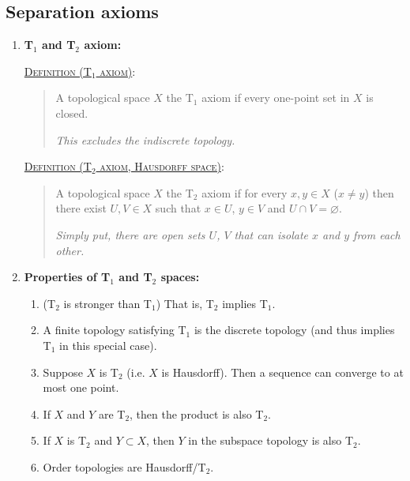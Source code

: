 \documentclass[letterpaper, 12pt]{article}
\newcommand{\Taxiom}[1]{T$_\text{#1}$}
\newcommand{\defn}[2]{\textsc{\underline{Definition (#1)}:}\begin{quote} #2\end{quote}}
\let\emptyset\varnothing
\begin{document}
    \subsection{Separation axioms}
        \begin{enumerate}[resume]
        \item \textbf{\Taxiom{1} and \Taxiom{2} axiom:}

        \defn{\Taxiom{1} axiom}{A topological space $X$ the \Taxiom{1} axiom if every one-point set in $X$ is closed.

        \textit{This excludes the indiscrete topology.}}

        \defn{\Taxiom{2} axiom, Hausdorff space}{A topological space $X$ the \Taxiom{2} axiom if for every $x, y\in X$ ($x\ne y$) then there exist $U, V\in X$ such that $x\in U$, $y\in V$ and $U\cap V = \emptyset$.

        \textit{Simply put, there are open sets $U$, $V$ that can isolate $x$ and $y$ from each other.}}
        \item \textbf{Properties of \Taxiom{1} and \Taxiom{2} spaces:}
        \begin{enumerate}
        \item (\Taxiom{2} is stronger than \Taxiom{1}) That is, \Taxiom{2} implies \Taxiom{1}.
        \item A finite topology satisfying \Taxiom{1} is the discrete topology (and thus implies \Taxiom{1} in this special case).
        \item Suppose $X$ is \Taxiom{2} (i.e. $X$ is Hausdorff). Then a sequence can converge to at most one point.
        \item If $X$ and $Y$ are \Taxiom{2}, then the product is also \Taxiom{2}.
        \item If $X$ is \Taxiom{2} and $Y\subset X$, then $Y$ in the subspace topology is also \Taxiom{2}.
        \item Order topologies are Hausdorff/\Taxiom{2}.
        \end{enumerate}
    \end{enumerate}

\end{document}
